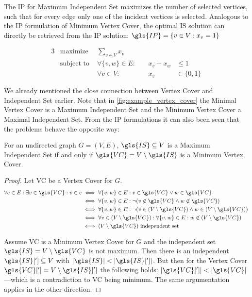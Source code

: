 The \gls{IP} for Maximum Independent Set maximizes the number of 
selected vertices, such that for every edge only one of the incident 
vertices is selected. Analogous to the \gls{IP} formulation of Minimum
Vertex Cover, the optimal \gls{IS} solution can directly be retrieved 
from the \gls{IP} solution:
\( \gls{IP} = \{v \in V : x_v = 1\} \)

\begin{problem}
  \begin{alignat*}{3}
    &\text{maximize } & \sum\limits_{v \in V} x_v \\
    &\text{subject to } & \forall \{v,w\} \in E : &~& x_v + x_w &\leq 1 \\
    && \forall v \in V : &~& x_v &\in \{0,1\}
  \end{alignat*}
\end{problem}

We already mentioned the close connection between Vertex Cover and
Independent Set earlier. Note that in \cref{fig:example_vertex_cover}
the Minimal Vertex Cover is a Maximum Independent Set and the Minimum
Vertex Cover a Maximal Independent Set. From the \gls{IP} formulations
 it can also been seen that the problems behave the opposite way:

\begin{theorem}
  \label{thm:independent_set_vertex_cover}
  For an undirected graph \(G=(V,E)\), \(\gls{IS} \subseteq V\)
  is a Maximum Independent Set if and only if
  \(\gls{VC} = V \setminus \gls{IS}\)
  is a Minimum Vertex Cover.
  \begin{proof}
  Let \gls{VC} be a Vertex Cover for \(G\). 
  \begin{alignat*}{1}
    \forall e \in E : \exists v \in \gls{VC} : v \in e
    &\iff \forall \{v,w\} \in E :
      v \in \gls{VC} \lor w \in \gls{VC} \\
    &\iff \forall \{v, w\} \in E :
      \lnot(v \not\in \gls{VC} \land w \not\in \gls{VC}) \\
    &\iff \forall \{v, w\} \in E :
      \lnot(v \in (V \setminus \gls{VC})
        \land w \in (V \setminus \gls{VC})) \\
    &\iff \forall v \in (V \setminus \gls{VC}) :
      \forall \{v, w\} \in E :
      w \not\in (V \setminus \gls{VC}) \\
    &\iff (V \setminus \gls{VC}) \text{ independent set}
  \end{alignat*}
  
  Assume \gls{VC} is a Minimum Vertex Cover for \(G\) and the
  independent set \(\gls{IS} = V \setminus \gls{VC}\) is not maximum.
  Then there is an independent \(\gls{IS}['] \subseteq V\) with
  \(|\gls{IS}| < |\gls{IS}[']|\). But then for the Vertex Cover
  \(\gls{VC}['] = V \setminus \gls{IS}[']\) the following holds:
  \(|\gls{VC}[']| < |\gls{VC}|\)---which is a contradiction to
  \gls{VC} being minimum. The same argumentation applies in the other
  direction.
  \end{proof}
\end{theorem}

